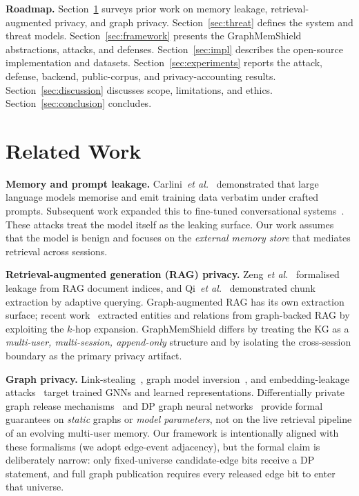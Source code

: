 \documentclass[journal,10pt,twocolumn]{IEEEtran}
\begin{document}
\noindent\textbf{Roadmap.} Section~\ref{sec:related} surveys prior
work on memory leakage, retrieval-augmented privacy, and graph
privacy. Section~\ref{sec:threat} defines the system and threat
models. Section~\ref{sec:framework} presents the GraphMemShield
abstractions, attacks, and defenses. Section~\ref{sec:impl}
describes the open-source implementation and datasets.
Section~\ref{sec:experiments} reports the attack, defense, backend,
public-corpus, and privacy-accounting results.
Section~\ref{sec:discussion} discusses scope, limitations, and
ethics. Section~\ref{sec:conclusion} concludes.

\section{Related Work}
\label{sec:related}

\textbf{Memory and prompt leakage.} Carlini~\textit{et
al.}~\cite{Carlini2021} demonstrated that large language models
memorise and emit training data verbatim under crafted prompts.
Subsequent work expanded this to fine-tuned conversational
systems~\cite{Mireshghallah2023}. These attacks treat the model itself
as the leaking surface. Our work assumes that the model is benign and
focuses on the \emph{external memory store} that mediates retrieval
across sessions.

\textbf{Retrieval-augmented generation (RAG) privacy.} Zeng
\textit{et al.}~\cite{Zeng2024} formalised leakage from RAG document
indices, and Qi~\textit{et al.}~\cite{Qi2024RAG} demonstrated chunk
extraction by adaptive querying. Graph-augmented RAG has its own
extraction surface; recent work~\cite{Wang2025GraphRAG} extracted
entities and relations from graph-backed RAG by exploiting the
$k$-hop expansion. GraphMemShield differs by treating the KG as a
\emph{multi-user, multi-session, append-only} structure and by
isolating the cross-session boundary as the primary privacy artifact.

\textbf{Graph privacy.} Link-stealing~\cite{He2021Linkstealing},
graph model inversion~\cite{Wu2022GraphMI}, and embedding-leakage
attacks~\cite{Duddu2020} target trained GNNs and learned
representations. Differentially private graph release
mechanisms~\cite{Hay2009,Jorgensen2016,Karwa2014} and DP graph neural
networks~\cite{Daigavane2021,Sajadmanesh2023GAP} provide formal
guarantees on \emph{static} graphs or \emph{model parameters}, not on
the live retrieval pipeline of an evolving multi-user memory. Our
framework is intentionally aligned with these formalisms (we adopt
edge-event adjacency), but the formal claim is deliberately narrow:
only fixed-universe candidate-edge bits receive a DP statement, and
full graph publication requires every released edge bit to enter that
universe.
\end{document}
